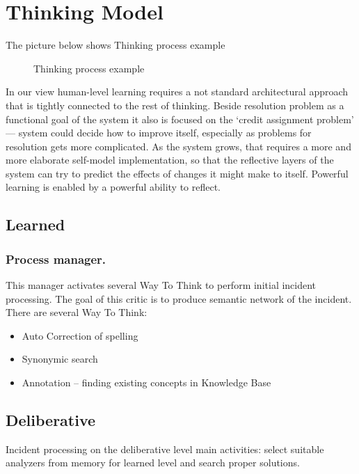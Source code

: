 \documentclass[runningheads,a4paper]{llncs}
\begin{document}
\section{Thinking Model}
The picture below shows Thinking process example

\begin{figure}


\caption{Thinking process example}
\end{figure}
In our view human-level learning requires a not standard architectural approach that is tightly connected to the rest of thinking. Beside resolution problem as a functional goal of the system it also is focused on the ‘credit assignment problem’ — system could decide how to improve itself, especially as problems for resolution gets more complicated.  As the system grows, that requires a more and more elaborate self-model implementation, so that the reflective layers of the system can try to predict the effects of changes it might make to itself. Powerful learning is enabled by a powerful ability to reflect.


\subsection{Learned}

\subsubsection{Process manager.} This manager activates several Way To Think to perform initial incident processing. The goal of this critic is to produce semantic network of the incident. There are several Way To Think:
\begin{itemize}
 \item Auto Correction of spelling
 \item Synonymic search
 \item Annotation – finding existing concepts in Knowledge Base
\end{itemize}

\subsection{Deliberative}

Incident processing on the deliberative level main activities: select suitable analyzers from memory for learned level and search proper solutions.
\end{document}
